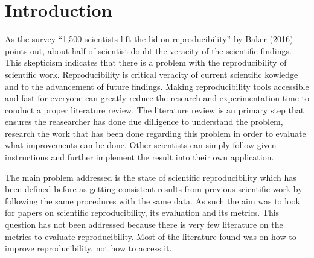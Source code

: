 \documentclass[
10pt, %
a4paper, %
oneside, %
headinclude,footinclude, %
BCOR5mm, %
]{scrartcl}
\begin{document}
\let\thefootnote\relax{}



\newpage %


\section{Introduction}


As the survey “1,500 scientists lift the lid on reproducibility” by Baker (2016) points out, about half of scientist doubt the veracity of the scientific findings. 
This skepticism indicates that there is a problem with the reproducibility of scientific work. 
Reproducibility is critical veracity of current scientific kowledge and to the advancement of future findings. 
Making reproducibility tools accessible and fast for everyone can greatly reduce the research and experimentation time to conduct a proper literature review. 
The literature review is an primary step that ensures the reasearcher has done due dilligence to understand the problem, research the work that has been done regarding this problem in order to evaluate what improvements can be done. 
Other scientists can simply follow given instructions and further implement the result into their own application.  

The main problem addressed is the state of scientific reproducibility which has been defined before as getting consistent results from previous scientific work by following the same procedures with the same data.
 As such the aim was to look for papers on scientific reproducibility, its evaluation and its metrics. 
This question has not been addressed because there is very few literature on the metrics to evaluate reproducibility. 
Most of the literature found was on how to improve reproducibility, not how to access it. 
\end{document}
